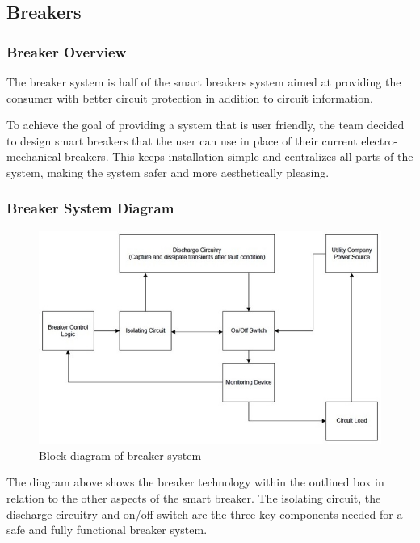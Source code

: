 \subsection{Breakers}
\subsubsection{Breaker Overview}
The breaker system is half of the smart breakers system aimed at providing the consumer with better circuit protection in addition to circuit information. 

To achieve the goal of providing a system that is user friendly, the team decided to design smart breakers that the user can use in place of their current electro-mechanical breakers. This keeps installation simple and centralizes all parts of the system, making the system safer and more aesthetically pleasing.

\subsubsection{Breaker System Diagram}
\begin{figure}[htbp]
\begin{center}
\includegraphics[width=6in]{includes/NJBreakerBlock}
\caption{Block diagram of breaker system}
\label{fig:breaker_block_diagram}
\end{center}
\end{figure}

The diagram above shows the breaker technology within the outlined box in relation to the other aspects of the smart breaker. The isolating circuit, the discharge circuitry and on/off switch are the three key components needed for a safe and fully functional breaker system.

